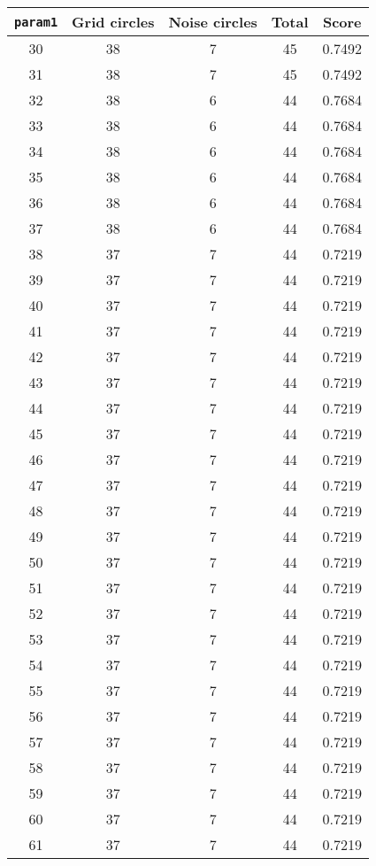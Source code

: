 \documentclass[letterpaper, 12pt]{article}
\begin{document}
\begin{longtable}{|c|c|c|c|c|}
\hline
\textbf{\texttt{param1}} & \textbf{Grid circles} & \textbf{Noise circles} & \textbf{Total} & \textbf{Score} \\
\hline
30 & 38 & 7 & 45 & 0.7492 \\
\hline
31 & 38 & 7 & 45 & 0.7492 \\
\hline
32 & 38 & 6 & 44 & 0.7684 \\
\hline
33 & 38 & 6 & 44 & 0.7684 \\
\hline
34 & 38 & 6 & 44 & 0.7684 \\
\hline
35 & 38 & 6 & 44 & 0.7684 \\
\hline
36 & 38 & 6 & 44 & 0.7684 \\
\hline
37 & 38 & 6 & 44 & 0.7684 \\
\hline
38 & 37 & 7 & 44 & 0.7219 \\
\hline
39 & 37 & 7 & 44 & 0.7219 \\
\hline
40 & 37 & 7 & 44 & 0.7219 \\
\hline
41 & 37 & 7 & 44 & 0.7219 \\
\hline
42 & 37 & 7 & 44 & 0.7219 \\
\hline
43 & 37 & 7 & 44 & 0.7219 \\
\hline
44 & 37 & 7 & 44 & 0.7219 \\
\hline
45 & 37 & 7 & 44 & 0.7219 \\
\hline
46 & 37 & 7 & 44 & 0.7219 \\
\hline
47 & 37 & 7 & 44 & 0.7219 \\
\hline
48 & 37 & 7 & 44 & 0.7219 \\
\hline
49 & 37 & 7 & 44 & 0.7219 \\
\hline
50 & 37 & 7 & 44 & 0.7219 \\
\hline
51 & 37 & 7 & 44 & 0.7219 \\
\hline
52 & 37 & 7 & 44 & 0.7219 \\
\hline
53 & 37 & 7 & 44 & 0.7219 \\
\hline
54 & 37 & 7 & 44 & 0.7219 \\
\hline
55 & 37 & 7 & 44 & 0.7219 \\
\hline
56 & 37 & 7 & 44 & 0.7219 \\
\hline
57 & 37 & 7 & 44 & 0.7219 \\
\hline
58 & 37 & 7 & 44 & 0.7219 \\
\hline
59 & 37 & 7 & 44 & 0.7219 \\
\hline
60 & 37 & 7 & 44 & 0.7219 \\
\hline
61 & 37 & 7 & 44 & 0.7219 \\

\end{longtable}
\end{document}
